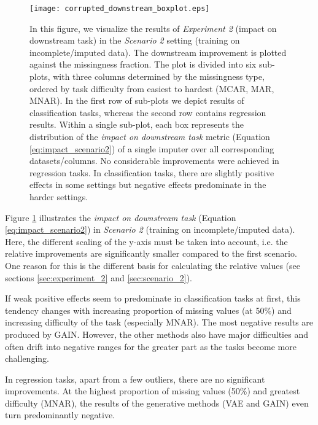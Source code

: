 \begin{figure}\centering
	\texttt{[image: corrupted\_downstream\_boxplot.eps]}

	\caption[Downstream Ranks - Corrupted]{In this figure, we visualize the results of \textit{Experiment 2} (impact on downstream task) in the \textit{Scenario 2} setting (training on incomplete/imputed data). The downstream improvement is plotted against the missingness fraction. The plot is divided into six sub-plots, with three columns determined by the missingness type, ordered by task difficulty from easiest to hardest (MCAR, MAR, MNAR). In the first row of sub-plots we depict results of classification tasks, whereas the second row contains regression results. Within a single sub-plot, each box represents the distribution of the \textit{impact on downstream task} metric (Equation \ref{eq:impact_scenario2}) of a single imputer over all corresponding datasets/columns. No considerable improvements were achieved in regression tasks. In classification tasks, there are slightly positive effects in some settings but negative effects predominate in the harder settings.
    }
	\label{fig:corrupted_downstream_boxplot}
\end{figure}

Figure \ref{fig:corrupted_downstream_boxplot} illustrates the \textit{impact on downstream task} (Equation \ref{eq:impact_scenario2}) in \textit{Scenario 2} (training on incomplete/imputed data). Here, the different scaling of the y-axis must be taken into account, i.e. the relative improvements are significantly smaller compared to the first scenario. One reason for this is the different basis for calculating the relative values (see sections \autoref{sec:experiment_2} and \autoref{sec:scenario_2}).  

If weak positive effects seem to predominate in classification tasks at first, this tendency changes with increasing proportion of missing values (at 50\%) and increasing difficulty of the task (especially MNAR). The most negative results are produced by GAIN. However, the other methods also have major difficulties and often drift into negative ranges for the greater part as the tasks become more challenging.

In regression tasks, apart from a few outliers, there are no significant improvements. At the highest proportion of missing values (50\%) and greatest difficulty (MNAR), the results of the generative methods (VAE and GAIN) even turn predominantly negative.

